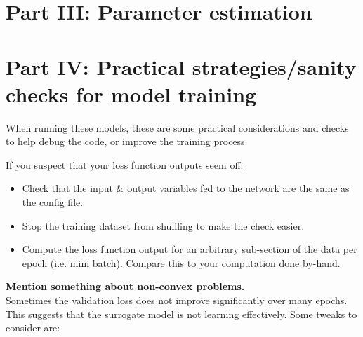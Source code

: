 \documentclass[11pt]{article}
\begin{document}
\pagebreak

\section{Part III: Parameter estimation}

\pagebreak

\section{Part IV: Practical strategies/sanity checks for model training}
When running these models, these are some practical considerations and checks to help debug the code, or improve the training process.

If you suspect that your loss function outputs seem off: 
\begin{itemize}
    \item Check that the input \& output variables fed to the network are the same as the config file. 
    \item Stop the training dataset from shuffling to make the check easier. 
    \item Compute the loss function output for an arbitrary sub-section of the data per epoch (i.e. mini batch). Compare this to your computation done by-hand. \\
\end{itemize}

\textbf{Mention something about non-convex problems.} \\

Sometimes the validation loss does not improve significantly over many epochs. This suggests that the surrogate model is not learning effectively. Some tweaks to consider are: 
\end{document}
